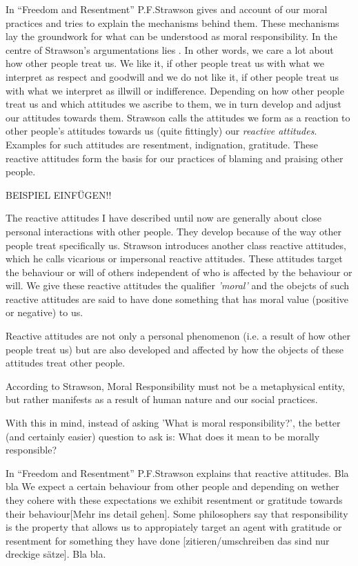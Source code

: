 \documentclass{article}
\begin{document}
In ``Freedom and Resentment'' P.F.Strawson gives and account of our moral
practices and tries to explain the mechanisms behind them. These mechanisms lay
the groundwork for what can be understood as moral responsibility.
In the centre of Strawson's argumentations lies \cite[p.5]{Strawson1962}. In other words, we care a lot about how other
people treat us. We like it, if other people treat us with what we interpret as
respect and goodwill and we do not like it, if other people treat us with what
we interpret as illwill or indifference. Depending on how other people treat us
and which attitudes we ascribe to them, we in turn develop and adjust our
attitudes towards them. Strawson calls the attitudes we form as a reaction to
other people's attitudes towards us (quite fittingly) our \textit{reactive
attitudes}. Examples for such attitudes are resentment, indignation, gratitude.
These reactive attitudes form the basis for our practices of blaming and
praising other people.

BEISPIEL EINFÜGEN!!

The reactive attitudes I have described until now are generally about close
personal interactions with other people. They develop because of the way other
people treat specifically us. Strawson introduces another class reactive
attitudes, which he calls vicarious or impersonal reactive attitudes. These
attitudes target the behaviour or will of others independent of who is affected
by the behaviour or will. We give these reactive attitudes the qualifier
\textit{'moral'} and the obejcts of such reactive attitudes are said to have
done something that has moral value (positive or negative) to us.



Reactive attitudes are not only a personal phenomenon (i.e. a result of how
other people treat us) but are also developed and affected by how the objects of
these attitudes treat other people.


According to Strawson, Moral Responsibility must not be a metaphysical entity,
but rather manifests as a result of human nature and our social practices.




With this in mind, instead of asking 'What is moral responsibility?', the better (and
certainly easier) question to ask is: What does it mean to be morally responsible?

In ``Freedom and Resentment'' P.F.Strawson explains that reactive attitudes. Bla
bla We expect a certain behaviour from other people and depending on wether they
cohere with these expectations we exhibit resentment or gratitude towards their
behaviour[Mehr ins detail gehen]. Some philosophers say that responsibility is
the property that allows us to appropiately target an agent with gratitude or
resentment for something they have done [zitieren/umschreiben das sind nur
dreckige sätze]. Bla bla.
\end{document}
